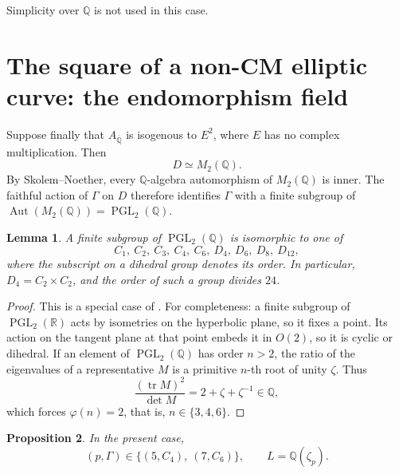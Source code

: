 \documentclass[11pt]{article}
\newtheorem{lemma}{Lemma}
\newtheorem{proposition}[lemma]{Proposition}
\newcommand{\Q}{\mathbb Q}
\newcommand{\R}{\mathbb R}
\DeclareMathOperator{\PGL}{PGL}
\begin{document}
Simplicity over \(\Q\) is not used in this case.

\section{The square of a non-CM elliptic curve: the endomorphism field}
\label{sec:endomorphism-field}

Suppose finally that \(A_{\overline{\Q}}\) is isogenous to \(E^2\),
where \(E\) has no complex multiplication. Then
\[
 D\simeq M_2(\Q).
\]
By Skolem--Noether, every \(\Q\)-algebra automorphism of \(M_2(\Q)\) is
inner. The faithful action of \(\Gamma\) on \(D\) therefore identifies
\(\Gamma\) with a finite subgroup of
\(\operatorname{Aut}(M_2(\Q))=\PGL_2(\Q)\).

\begin{lemma}\label{lem:pgl2}
A finite subgroup of \(\PGL_2(\Q)\) is isomorphic to one of
\[
 C_1,\ C_2,\ C_3,\ C_4,\ C_6,\ D_4,\ D_6,\ D_8,\ D_{12},
\]
where the subscript on a dihedral group denotes its order. In
particular, \(D_4=C_2\times C_2\), and the order of such a group divides
\(24\).
\end{lemma}

\begin{proof}
This is a special case of \cite[Introduction and
Proposition 1.1]{Beauville}. For completeness: a finite subgroup of
\(\PGL_2(\R)\) acts by isometries on the hyperbolic plane, so it fixes
a point. Its action on the tangent plane at that point embeds it in
\(O(2)\), so it is cyclic or dihedral. If an element of \(\PGL_2(\Q)\)
has order \(n>2\), the ratio of the eigenvalues of a representative
\(M\) is a primitive \(n\)-th root of unity \(\zeta\). Thus
\[
 \frac{(\operatorname{tr}M)^2}{\det M}=2+\zeta+\zeta^{-1}\in\Q,
\]
which forces \(\varphi(n)=2\), that is, \(n\in\{3,4,6\}\).
\end{proof}

\begin{proposition}\label{prop:cyclotomic}
In the present case,
\[
 (p,\Gamma)\in\{(5,C_4),\ (7,C_6)\},\qquad L=\Q(\zeta_p).
\]
\end{proposition}
\end{document}
